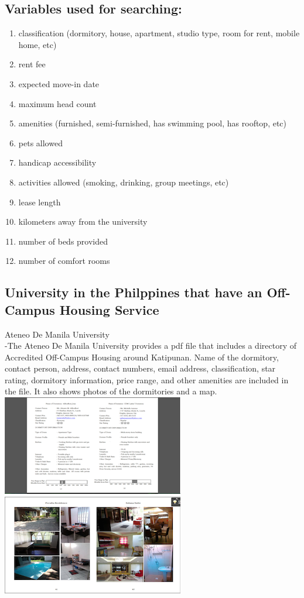 \documentclass[journal]{./IEEE/IEEEtran}
\begin{document}
	\subsection{Variables used for searching:}

		\begin{enumerate}
		\item classification (dormitory, house, apartment, studio type, room for rent, mobile home, etc)
		\item rent fee
		\item expected move-in date
		\item maximum head count
		\item amenities (furnished, semi-furnished, has swimming pool, has rooftop, etc)
		\item pets allowed
		\item handicap accessibility
		\item activities allowed (smoking, drinking, group meetings, etc)
		\item lease length
		\item kilometers away from the university
		\item number of beds provided
		\item number of comfort rooms
		\end{enumerate}
\subsection{University in the Philppines that have an Off-Campus Housing Service}
Ateneo De Manila University \\
	-The Ateneo De Manila University provides a pdf file that includes a directory of Accredited Off-Campus Housing around Katipunan. Name of the dormitory, contact person, address, contact numbers, email address, classification, star rating, dormitory information, price range, and other amenities are included in the file. It also shows photos of the dormitories and a map. \cite{electronic_admu} \\
\includegraphics[scale=0.70]{images/admu2.png}	\\
\includegraphics[scale=0.70]{images/admu3.png}
\end{document}
